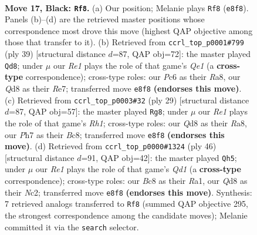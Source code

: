 \documentclass[11pt]{article}
\begin{document}
\clearpage

\begin{figure}[p]\centering
\begin{subfigure}{0.46\textwidth}\centering
\resizebox{\linewidth}{!}{%
\newchessgame
\chessboard[
  setfen={rnbqr1k1/p3b2p/1pp3pP/3p1pP1/P2P1P2/1P2P1N1/8/R2QKBNR b KQ - 4 17},
  showmover=false,
  pgfstyle=straightmove, color=movearrow, markmove={e8-f8}
]}
\caption{}
\end{subfigure}\hfill
\begin{subfigure}{0.46\textwidth}\centering
\resizebox{\linewidth}{!}{%
\newchessgame
\chessboard[
  setfen={r3q1k1/1p2rpp1/2p1bn1p/4Np1P/p2P1P2/P1QBP3/1P4P1/K1R4R b - - 0 20},
  showmover=false,
  pgfstyle=straightmove, color=movearrow, markmove={e8-d8}
]}
\caption{}
\end{subfigure}
\\[4pt]
\begin{subfigure}{0.46\textwidth}\centering
\resizebox{\linewidth}{!}{%
\newchessgame
\chessboard[
  setfen={r1b1k2r/4qp2/2p2p1p/npb1p3/p3P2N/P1NP4/BPP1Q1PP/R3K2R b KQkq - 3 15},
  showmover=false,
  pgfstyle=straightmove, color=movearrow, markmove={h8-g8}
]}
\caption{}
\end{subfigure}\hfill
\begin{subfigure}{0.46\textwidth}\centering
\resizebox{\linewidth}{!}{%
\newchessgame
\chessboard[
  setfen={3q2rk/p2b1ppn/2np3p/1rp1pP2/4P2P/1P1P2P1/P1NB1RB1/R2Q2K1 w - - 0 24},
  showmover=false,
  pgfstyle=straightmove, color=movearrow, markmove={d1-h5}
]}
\caption{}
\end{subfigure}
\caption{\textbf{Move 17, Black: \texttt{Rf8}.} (a) Our position; Melanie plays \texttt{Rf8} (\texttt{e8f8}). Panels (b)--(d) are the retrieved master positions whose correspondence most drove this move (highest QAP objective among those that transfer to it). (b) Retrieved from \texttt{ccrl\_top\_p0001\#799} (ply 39) [structural distance $d$=87, QAP obj=72]: the master played \texttt{Qd8}; under $\mu$ our \emph{Re1} plays the role of that game's \emph{Qe1} (a \textbf{cross-type} correspondence); cross-type roles: our \emph{P}c6 as their \emph{R}a8, our \emph{Q}d8 as their \emph{R}e7; transferred move \texttt{e8f8} \textbf{(endorses this move)}. (c) Retrieved from \texttt{ccrl\_top\_p0003\#32} (ply 29) [structural distance $d$=87, QAP obj=57]: the master played \texttt{Rg8}; under $\mu$ our \emph{Re1} plays the role of that game's \emph{Rh1}; cross-type roles: our \emph{Q}d8 as their \emph{R}a8, our \emph{P}h7 as their \emph{B}c8; transferred move \texttt{e8f8} \textbf{(endorses this move)}. (d) Retrieved from \texttt{ccrl\_top\_p0000\#1324} (ply 46) [structural distance $d$=91, QAP obj=42]: the master played \texttt{Qh5}; under $\mu$ our \emph{Re1} plays the role of that game's \emph{Qd1} (a \textbf{cross-type} correspondence); cross-type roles: our \emph{B}c8 as their \emph{R}a1, our \emph{Q}d8 as their \emph{N}c2; transferred move \texttt{e8f8} \textbf{(endorses this move)}. Synthesis: 7 retrieved analogs transferred to \texttt{Rf8} (summed QAP objective 295, the strongest correspondence among the candidate moves); Melanie committed it via the \texttt{search} selector.}
\label{fig:thought-m33}
\end{figure}
\end{document}
